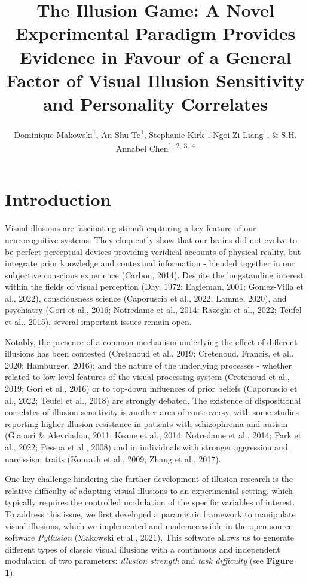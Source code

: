 \documentclass[
  man,floatsintext]{apa6}
\title{\textbf{The Illusion Game: A Novel Experimental Paradigm Provides Evidence in Favour of a General Factor of Visual Illusion Sensitivity and Personality Correlates}}
\author{Dominique Makowski\textsuperscript{1}, An Shu Te\textsuperscript{1}, Stephanie Kirk\textsuperscript{1}, Ngoi Zi Liang\textsuperscript{1}, \& S.H. Annabel Chen\textsuperscript{1, 2, 3, 4}}
\date{}
\affiliation{\vspace{0.5cm}\textsuperscript{1} School of Social Sciences, Nanyang Technological University, Singapore\\\textsuperscript{2} LKC Medicine, Nanyang Technological University, Singapore\\\textsuperscript{3} National Institute of Education, Singapore\\\textsuperscript{4} Centre for Research and Development in Learning, Nanyang Technological University, Singapore}
\begin{document}
\maketitle

\hypertarget{introduction}{%
\section{Introduction}\label{introduction}}

Visual illusions are fascinating stimuli capturing a key feature of our neurocognitive systems. They eloquently show that our brains did not evolve to be perfect perceptual devices providing veridical accounts of physical reality, but integrate prior knowledge and contextual information - blended together in our subjective conscious experience (Carbon, 2014). Despite the longstanding interest within the fields of visual perception (Day, 1972; Eagleman, 2001; Gomez-Villa et al., 2022), consciousness science (Caporuscio et al., 2022; Lamme, 2020), and psychiatry (Gori et al., 2016; Notredame et al., 2014; Razeghi et al., 2022; Teufel et al., 2015), several important issues remain open.

Notably, the presence of a common mechanism underlying the effect of different illusions has been contested (Cretenoud et al., 2019; Cretenoud, Francis, et al., 2020; Hamburger, 2016); and the nature of the underlying processes - whether related to low-level features of the visual processing system (Cretenoud et al., 2019; Gori et al., 2016) or to top-down influences of prior beliefs (Caporuscio et al., 2022; Teufel et al., 2018) are strongly debated. The existence of dispositional correlates of illusion sensitivity is another area of controversy, with some studies reporting higher illusion resistance in patients with schizophrenia and autism (Giaouri \& Alevriadou, 2011; Keane et al., 2014; Notredame et al., 2014; Park et al., 2022; Pessoa et al., 2008) and in individuals with stronger aggression and narcissism traits (Konrath et al., 2009; Zhang et al., 2017).

One key challenge hindering the further development of illusion research is the relative difficulty of adapting visual illusions to an experimental setting, which typically requires the controlled modulation of the specific variables of interest. To address this issue, we first developed a parametric framework to manipulate visual illusions, which we implemented and made accessible in the open-source software \emph{Pyllusion} (Makowski et al., 2021). This software allows us to generate different types of classic visual illusions with a continuous and independent modulation of two parameters: \emph{illusion strength} and \emph{task difficulty} (see \textbf{Figure 1}).
\end{document}
